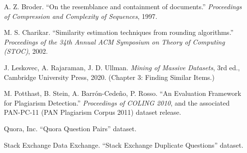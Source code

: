 \documentclass[11pt]{article}
\begin{document}
\begin{enumerate}[label={[\arabic*]}]
    \item A. Z. Broder. ``On the resemblance and containment of documents.'' \emph{Proceedings of
          Compression and Complexity of Sequences}, 1997.
    \item M. S. Charikar. ``Similarity estimation techniques from rounding algorithms.'' \emph{Proceedings
          of the 34th Annual ACM Symposium on Theory of Computing (STOC)}, 2002.
    \item J. Leskovec, A. Rajaraman, J. D. Ullman. \emph{Mining of Massive Datasets}, 3rd ed., Cambridge
          University Press, 2020. (Chapter 3: Finding Similar Items.)
    \item M. Potthast, B. Stein, A. Barr\'{o}n-Cede\~{n}o, P. Rosso. ``An Evaluation Framework for
          Plagiarism Detection.'' \emph{Proceedings of COLING 2010}, and the associated PAN-PC-11
          (PAN Plagiarism Corpus 2011) dataset release.
    \item Quora, Inc. ``Quora Question Pairs'' dataset.
    \item Stack Exchange Data Exchange. ``Stack Exchange Duplicate Questions'' dataset.
\end{enumerate}
\end{document}
